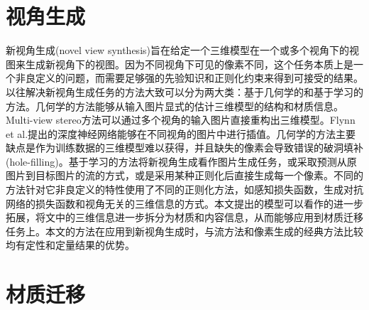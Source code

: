 \documentclass[UTF8,openany,AutoFakeBold,AutoFakeSlant,cs4size]{ctexbook}
\begin{document}
\section{视角生成}

新视角生成(novel view synthesis)旨在给定一个三维模型在一个或多个视角下的视图来生成新视角下的视图。因为不同视角下可见的像素不同，这个任务本质上是一个非良定义的问题，而需要足够强的先验知识和正则化约束来得到可接受的结果。以往解决新视角生成任务的方法大致可以分为两大类：基于几何学的和基于学习的方法。几何学的方法能够从输入图片显式的估计三维模型的结构和材质信息。Multi-view stereo\cite{Furukawa:2015:MST:2864699.2864700}方法可以通过多个视角的输入图片直接重构出三维模型。Flynn et al.\cite{7780964}提出的深度神经网络能够在不同视角的图片中进行插值。几何学的方法主要缺点是作为训练数据的三维模型难以获得，并且缺失的像素会导致错误的破洞填补(hole-filling)。基于学习的方法将新视角生成看作图片生成任务，或采取预测从原图片到目标图片的流\cite{Zhou2016ViewSB, sun2018multiview, olszewski2019tbn}的方式，或是采用某种正则化后直接生成每一个像素\cite{TDB16a, Huang_2017_ICCV, VIGAN, Park2017TransformationGroundedIG}。不同的方法针对它非良定义的特性使用了不同的正则化方法，如感知损失函数\cite{olszewski2019tbn}，生成对抗网络的损失函数\cite{Huang_2017_ICCV}和视角无关的三维信息\cite{VIGAN}的方式。本文提出的模型可以看作\cite{VIGAN}的进一步拓展，将文中的三维信息进一步拆分为材质和内容信息，从而能够应用到材质迁移任务上。本文的方法在应用到新视角生成时，与流方法和像素生成的经典方法比较均有定性和定量结果的优势。

\section{材质迁移}
\end{document}

